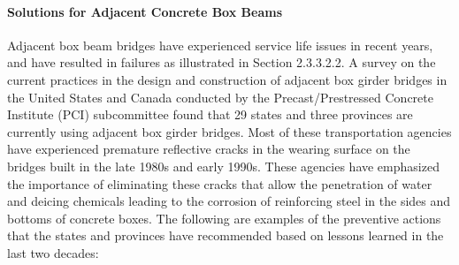\paragraph{Solutions for Adjacent Concrete Box Beams}
Adjacent box beam bridges have experienced service life issues in recent years, and have resulted in failures as
illustrated in Section 2.3.3.2.2. A survey on the current practices in the design and construction of adjacent box
girder bridges in the United States and Canada conducted by the Precast/Prestressed Concrete Institute (PCI)
subcommittee found that 29 states and three provinces are currently using adjacent box girder bridges. Most of these
transportation agencies have experienced premature reflective cracks in the wearing surface on the bridges built in
the late 1980s and early 1990s. These agencies have emphasized the importance of eliminating these cracks that
allow the penetration of water and deicing chemicals leading to the corrosion of reinforcing steel in the sides and
bottoms of concrete boxes. The following are examples of the preventive actions that the states and provinces have
recommended based on lessons learned in the last two decades:

